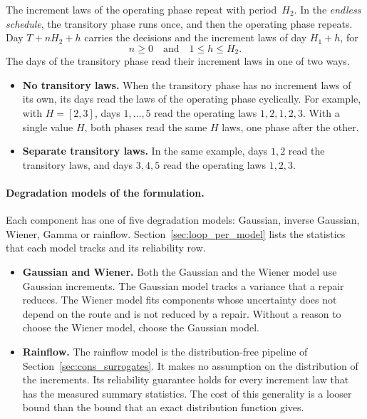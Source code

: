 \documentclass[11pt,a4paper]{article}
\theoremstyle{plain}
\theoremstyle{definition}
\theoremstyle{remark}
\begin{document}
The increment laws of the operating phase repeat with period~$H_2$.
In the \emph{endless schedule}, the transitory phase runs once, and then the operating phase repeats.
Day $T + nH_2 + h$ carries the decisions and the increment laws of day $H_1 + h$, for
\begin{equation}
  n \ge 0 \quad\text{and}\quad 1 \le h \le H_2.
\end{equation}
The days of the transitory phase read their increment laws in one of two ways.
\begin{itemize}
  \item \textbf{No transitory laws.} When the transitory phase has no increment laws of its own, its days read the laws of the operating phase cyclically.
    For example, with $H = [2, 3]$, days $1,\ldots,5$ read the operating laws $1, 2, 1, 2, 3$.
    With a single value $H$, both phases read the same $H$ laws, one phase after the other.
  \item \textbf{Separate transitory laws.} In the same example, days $1, 2$ read the transitory laws, and days $3, 4, 5$ read the operating laws $1, 2, 3$.
\end{itemize}

\paragraph{Degradation models of the formulation.}
Each component has one of five degradation models: Gaussian, inverse Gaussian, Wiener, Gamma or rainflow.
Section~\ref{sec:loop_per_model} lists the statistics that each model tracks and its reliability row.
\begin{itemize}
  \item \textbf{Gaussian and Wiener.} Both the Gaussian and the Wiener model use Gaussian increments.
    The Gaussian model tracks a variance that a repair reduces.
    The Wiener model fits components whose uncertainty does not depend on the route and is not reduced by a repair.
    Without a reason to choose the Wiener model, choose the Gaussian model.
  \item \textbf{Rainflow.} The rainflow model is the distribution-free pipeline of Section~\ref{sec:cons_surrogates}.
    It makes no assumption on the distribution of the increments.
    Its reliability guarantee holds for every increment law that has the measured summary statistics.
    The cost of this generality is a looser bound than the bound that an exact distribution function gives.
\end{itemize}
\end{document}
